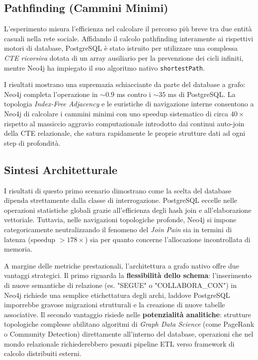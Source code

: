 \subsection{Pathfinding (Cammini Minimi)}
L'esperimento misura l'efficienza nel calcolare il percorso più breve tra due entità casuali nella rete sociale. Affidando il calcolo pathfinding interamente ai rispettivi motori di database, PostgreSQL è stato istruito per utilizzare una complessa \textit{CTE ricorsiva} dotata di un array ausiliario per la prevenzione dei cicli infiniti, mentre Neo4j ha impiegato il suo algoritmo nativo \texttt{shortestPath}.

I risultati mostrano una supremazia schiacciante da parte del database a grafo: Neo4j completa l'operazione in $\sim 0.9$ ms contro i $\sim 35$ ms di PostgreSQL. La topologia \textit{Index-Free Adjacency} e le euristiche di navigazione interne consentono a Neo4j di calcolare i cammini minimi con uno speedup sistematico di circa $40\times$ rispetto al massiccio aggravio computazionale introdotto dai continui auto-join della CTE relazionale, che satura rapidamente le proprie strutture dati ad ogni step di profondità.

\subsection{Sintesi Architetturale}
I risultati di questo primo scenario dimostrano come la scelta del database dipenda strettamente dalla classe di interrogazione. PostgreSQL eccelle nelle operazioni statistiche globali grazie all'efficienza degli hash join e all'elaborazione vettoriale. Tuttavia, nelle navigazioni topologiche profonde, Neo4j si impone categoricamente neutralizzando il fenomeno del \textit{Join Pain} sia in termini di latenza (speedup $>178\times$) sia per quanto concerne l'allocazione incontrollata di memoria.

A margine delle metriche prestazionali, l'architettura a grafo nativo offre due vantaggi strategici. Il primo riguarda la \textbf{flessibilità dello schema}: l'inserimento di nuove semantiche di relazione (es. "SEGUE" o "COLLABORA\_CON") in Neo4j richiede una semplice etichettatura degli archi, laddove PostgreSQL imporrebbe gravose migrazioni strutturali e la creazione di nuove tabelle associative. Il secondo vantaggio risiede nelle \textbf{potenzialità analitiche}: strutture topologiche complesse abilitano algoritmi di \textit{Graph Data Science} (come PageRank o Community Detection) direttamente all'interno del database, operazioni che nel mondo relazionale richiederebbero pesanti pipeline ETL verso framework di calcolo distribuiti esterni.

